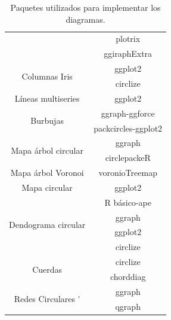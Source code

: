 \documentclass{article}\usepackage[]{graphicx}\usepackage[]{color}
\begin{document}
\begin{table}[h!]
\begin{tabular}{|c|c|}
                            & plotrix \\
                            & ggiraphExtra \\
\hline
\multirow{2}{14em}{Columnas Iris} & ggplot2 \\ 
                            & circlize \\ 
\hline
\multirow{1}{14em}{L\'ineas multiseries} & ggplot2 \\ 
\hline
\multirow{2}{14em}{Burbujas} & ggraph-ggforce \\ 
                            & packcircles-ggplot2 \\ 
\hline
\multirow{2}{14em}{Mapa \'arbol circular} & ggraph \\ 
                            & circlepackeR \\ 
\hline
\multirow{1}{14em}{Mapa \'arbol Voronoi} & voronioTreemap \\ 
\hline
\multirow{1}{14em}{Mapa circular} & ggplot2 \\ 
\hline
\multirow{4}{14em}{Dendograma circular} & R b\'asico-ape \\ 
                            & ggraph \\ 
                            & ggplot2 \\ 
                            & circlize \\  
\hline
\multirow{2}{14em}{Cuerdas} & circlize \\ 
                            & chorddiag \\ 
\hline
\multirow{2}{14em}{Redes Circulares \'} & ggraph \\ 
                            & qgraph \\ 
\hline
\end{tabular}
\caption{Paquetes utilizados para implementar los diagramas.}
\label{table:tabla1}
\end{table}
\clearpage
\end{document}
